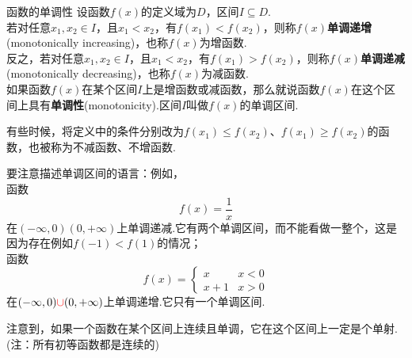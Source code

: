 \documentclass[lang=cn, zihao=5]{elegantbook}
\begin{document}
\begin{definition}{函数的单调性} %
    设函数$f(x)$的定义域为$D$，区间$I \subseteq D$.\\
    若对任意$x_1,x_2 \in I$，且$x_1 < x_2$，有$f(x_1) < f(x_2)$，则称$f(x)$\textbf{单调递增}(monotonically increasing)，也称$f(x)$为增函数.\\
    反之，若对任意$x_1,x_2 \in I$，且$x_1 < x_2$，有$f(x_1) > f(x_2)$，则称$f(x)$\textbf{单调递减}(monotonically decreasing)，也称$f(x)$为减函数.\\
    如果函数$f(x)$在某个区间$I$上是增函数或减函数，那么就说函数$f(x)$在这个区间上具有\textbf{单调性}(monotonicity).区间$I$叫做$f(x)$的单调区间.
\end{definition}
\begin{remark}
    有些时候，将定义中的条件分别改为$f(x_1) \leq f(x_2)$、$f(x_1) \geq f(x_2)$的函数，也被称为不减函数、不增函数.
\end{remark}
\begin{note}
    要注意描述单调区间的语言：例如，\\
    函数$$f(x)=\frac{1}{x}$$
    在$(- \infty , 0)$\color{red}{和}\color{black}$(0 , + \infty)$上单调递减.它有两个单调区间，而不能看做一整个，这是因为存在例如$f(-1) < f(1)$的情况；\\
    函数$$ f(x)=\begin{cases}
    	x &x<0 \\
    	x+1 &x>0
    \end{cases}$$
    在$(- \infty , 0) \color{red}{\cup}\color{black} (0 , + \infty)$上单调递增.它只有一个单调区间.
\end{note}

注意到，如果一个函数在某个区间上连续且单调，它在这个区间上一定是个单射.(注：所有初等函数都是连续的)
\end{document}
